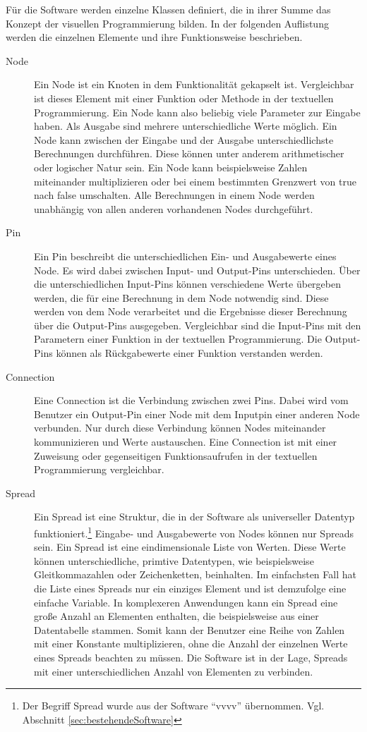 \documentclass[a4paper, 
               12pt,
               DIV=calc,
               version=first,
               pdftex,
               headsepline,
               footsepline,
               bibtotocnumbered,
               liststotocnumbered]{scrreprt}
\begin{document}
Für die Software werden einzelne Klassen definiert, die in ihrer Summe das Konzept der visuellen
Programmierung bilden. In der folgenden Auflistung werden die einzelnen
Elemente und ihre Funktionsweise beschrieben.
\begin{description}
\item[Node]
Ein Node ist ein Knoten in dem Funktionalität gekapselt ist. Vergleichbar ist dieses
Element mit einer Funktion oder Methode in der textuellen Programmierung. Ein Node kann also
beliebig viele Parameter zur Eingabe haben. Als Ausgabe sind mehrere unterschiedliche Werte möglich.
Ein Node kann zwischen der Eingabe und der Ausgabe unterschiedlichste Berechnungen durchführen.
Diese können unter anderem arithmetischer oder logischer Natur sein. Ein Node kann beispielsweise
Zahlen miteinander multiplizieren oder bei einem bestimmten Grenzwert von true nach false
umschalten.
Alle Berechnungen in einem Node werden unabhängig von allen anderen vorhandenen Nodes durchgeführt.
\item[Pin]
Ein Pin beschreibt die unterschiedlichen Ein- und Ausgabewerte eines Node.
Es wird dabei zwischen Input- und Output-Pins unterschieden. Über die unterschiedlichen
Input-Pins können verschiedene Werte übergeben werden, die für eine Berechnung in dem Node notwendig sind.
Diese werden von dem Node verarbeitet und die Ergebnisse dieser Berechnung
über die Output-Pins ausgegeben.
Vergleichbar sind die Input-Pins mit den Parametern einer Funktion in der textuellen Programmierung.
Die Output-Pins können als Rückgabewerte einer Funktion verstanden werden.
\item[Connection]
Eine Connection ist die Verbindung zwischen zwei Pins. Dabei wird vom Benutzer ein Output-Pin einer
Node mit dem Inputpin einer anderen Node verbunden. Nur durch diese Verbindung können
Nodes miteinander kommunizieren und Werte austauschen. Eine Connection
ist mit einer Zuweisung oder gegenseitigen Funktionsaufrufen in der textuellen Programmierung vergleichbar.
\item[Spread]
Ein Spread ist eine Struktur, die in der Software als universeller Datentyp funktioniert.\footnote{Der
Begriff Spread wurde aus der Software "`vvvv"' übernommen. Vgl. Abschnitt \ref{sec:bestehendeSoftware}}
Eingabe- und Ausgabewerte von Nodes können nur Spreads sein. Ein Spread ist eine 
eindimensionale Liste von Werten. Diese Werte können unterschiedliche, primtive Datentypen,
wie beispielsweise Gleitkommazahlen oder Zeichenketten, beinhalten. Im einfachsten Fall hat
die Liste eines Spreads nur ein einziges Element und ist demzufolge eine einfache Variable. In komplexeren
Anwendungen kann ein Spread eine große Anzahl an Elementen enthalten, die beispielsweise
aus einer Datentabelle stammen. Somit kann der Benutzer eine Reihe von Zahlen mit
einer Konstante multiplizieren, ohne die Anzahl der einzelnen Werte eines Spreads
beachten zu müssen. Die Software ist in der Lage, Spreads mit einer unterschiedlichen
Anzahl von Elementen zu verbinden.
\end{description}
\end{document}
